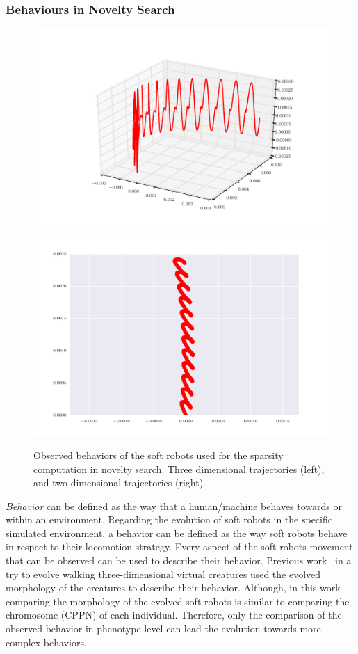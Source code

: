 \documentclass{sig-alternate}
\begin{document}
\subsubsection*{Behaviours in Novelty Search}

\begin{figure}[t!]
\centering
\includegraphics[scale=0.19]{../Figures/Behaviors/3d.pdf}\includegraphics[scale=0.18]{../Figures/Behaviors/2d.pdf}
\caption{Observed behaviors of the soft robots used for the sparsity computation in novelty search. Three dimensional trajectories (left), and two dimensional trajectories (right).}
\label{fig:Behaviors}
\end{figure}

\emph{Behavior} can be defined as the way that a human/machine behaves towards or within an environment. Regarding the evolution of soft robots in the specific simulated environment, a behavior can be defined as the way soft robots behave in respect to their locomotion strategy. Every aspect of the soft robots movement that can be observed can be used to describe their behavior. Previous work~\cite{lehman2011evolving} in a try to evolve walking three-dimensional virtual creatures used the evolved morphology of the creatures to describe their behavior. Although, in this work comparing the morphology of the evolved soft robots is similar to comparing the chromosome (CPPN) of each individual. Therefore, only the comparison of the observed behavior in phenotype level can lead the evolution towards more complex behaviors.
\end{document}
